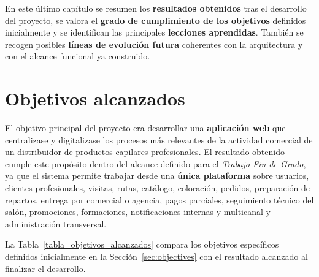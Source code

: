 En este último capítulo se resumen los \textbf{resultados obtenidos} tras el desarrollo del proyecto, se valora el \textbf{grado de cumplimiento de los objetivos} definidos inicialmente y se identifican las principales \textbf{lecciones aprendidas}. También se recogen posibles \textbf{líneas de evolución futura} coherentes con la arquitectura y con el alcance funcional ya construido.

\section{Objetivos alcanzados}

El objetivo principal del proyecto era desarrollar una \textbf{aplicación web} que centralizase y digitalizase los procesos más relevantes de la actividad comercial de un distribuidor de productos capilares profesionales. El resultado obtenido cumple este propósito dentro del alcance definido para el \textit{Trabajo Fin de Grado}, ya que el sistema permite trabajar desde una \textbf{única plataforma} sobre usuarios, clientes profesionales, visitas, rutas, catálogo, coloración, pedidos, preparación de repartos, entrega por comercial o agencia, pagos parciales, seguimiento técnico del salón, promociones, formaciones, notificaciones internas y multicanal y administración transversal.

La Tabla~\ref{tabla_objetivos_alcanzados} compara los objetivos específicos definidos inicialmente en la Sección~\ref{sec:objectives} con el resultado alcanzado al finalizar el desarrollo.

